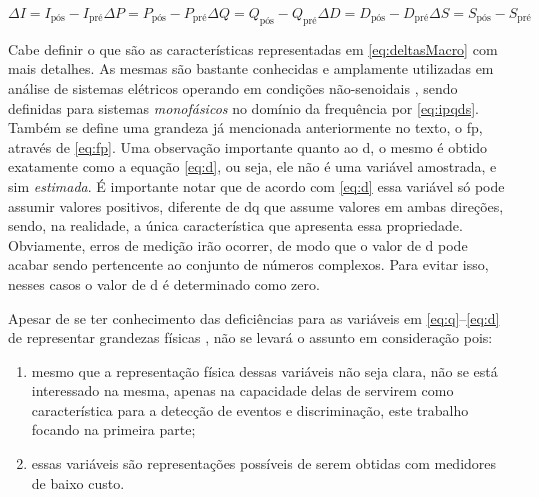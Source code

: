 \begin{subequations} \label{eq:deltasMacro}
\begin{equation} \label{eq:dI}
\Delta I = I_{\text{pós}} - I_{\text{pré}}
\end{equation}
\begin{equation} \label{eq:dP}
\Delta P = P_{\text{pós}} - P_{\text{pré}}
\end{equation}
\begin{equation} \label{eq:dQ}
\Delta Q = Q_{\text{pós}} - Q_{\text{pré}}
\end{equation}
\begin{equation} \label{eq:dD}
\Delta D = D_{\text{pós}} - D_{\text{pré}}
\end{equation}
\begin{equation} \label{eq:dS}
\Delta S = S_{\text{pós}} - S_{\text{pré}}
\end{equation}
\end{subequations}

Cabe definir o que são as características representadas em
\ref{eq:deltasMacro} com mais detalhes. As mesmas são bastante
conhecidas e amplamente utilizadas em análise de sistemas elétricos
operando em condições não-senoidais \cite{akagi2007instantaneous},
sendo definidas para sistemas \emph{monofásicos} no domínio da
frequência por \ref{eq:ipqds}. Também se define uma grandeza já
mencionada anteriormente no texto, o \gls{fp}, através de \ref{eq:fp}.
Uma observação importante quanto ao \acs{d}, o mesmo é obtido
exatamente como a equação \ref{eq:d}, ou seja, ele não é uma
variável amostrada, e sim \emph{estimada}. É importante notar que de
acordo com \ref{eq:d} essa variável só pode assumir valores positivos,
diferente de \acs{dq} que assume valores em ambas direções, sendo, na
realidade, a única característica que apresenta essa propriedade.
Obviamente, erros de medição irão ocorrer, de modo que o valor de
\acs{d} pode acabar sendo pertencente ao conjunto de números complexos.
Para evitar isso, nesses casos o valor de \acs{d} é determinado como
zero.

Apesar de se ter conhecimento das deficiências para as variáveis em
\ref{eq:q}--\ref{eq:d} de representar grandezas físicas \cite[cap.
2]{akagi2007instantaneous}, não se levará o assunto em consideração
pois: 

\begin{enumerate}
\item mesmo que a representação física dessas variáveis não seja clara, 
não se está interessado na mesma, apenas na capacidade delas de
servirem como característica para a detecção de eventos e
discriminação, este trabalho focando na primeira parte;
\item essas variáveis são representações possíveis de serem obtidas com
medidores de baixo custo. 
\end{enumerate}

